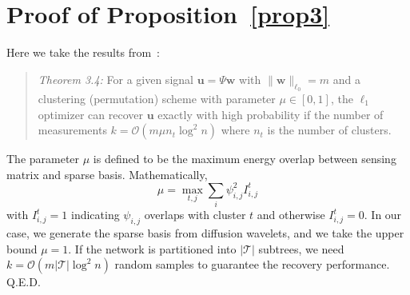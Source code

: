 \documentclass[conference]{IEEEtran}
\begin{document}
\section{Proof of Proposition~\ref{prop3}} \label{apx:prop3}

Here we take the results from~\cite{LeeO-ASC10}:
  \begin{quote}
  \textit{Theorem 3.4:} For a given signal $\mathbf{u}=\Psi\mathbf{w}$ with $\|\mathbf{w}\|_{\ell_0}=m$ and a clustering (permutation) scheme with parameter $\mu\in[0,1]$, the $\ell_1$ optimizer can recover $\mathbf{u}$ exactly with high probability if the number of measurements $k=\mathcal{O}(m\mu n_t\log^2n)$ where $n_t$ is the number of clusters.
  \end{quote}
The parameter $\mu$ is defined to be the maximum energy overlap between sensing matrix and sparse basis. Mathematically,
\[\mu = \max_{t,j}\sum_{i}\psi^2_{i,j}I^t_{i,j}\]
with $I^t_{i,j}=1$ indicating $\psi_{i,j}$ overlaps with cluster $t$ and otherwise $I^t_{i,j}=0$. In our case, we generate the sparse basis from diffusion wavelets, and we take the upper bound $\mu=1$. If the network is partitioned into $|\mathcal{T}|$ subtrees, we need $k=\mathcal{O}(m|\mathcal{T}|\log^2n)$ random samples to guarantee the recovery performance. \hfill Q.E.D.
\end{document}
